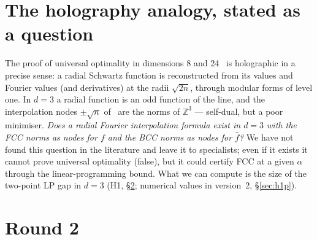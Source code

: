 \documentclass[11pt,a4paper]{article}
\begin{document}
\section{The holography analogy, stated as a question}
The proof of universal optimality in dimensions 8 and 24~\cite{CKMRV22} is holographic in a precise sense: a radial Schwartz function
is reconstructed from its values and Fourier values (and derivatives) at the radii $\sqrt{2n}$, through modular forms of level
one. In $d=3$ a radial function is an odd function of the line, and the interpolation nodes $\pm\sqrt n$ of~\cite{RV19} are the
norms of $\mathbb Z^3$ --- self-dual, but a poor minimiser. \emph{Does a radial Fourier interpolation formula exist in $d=3$ with the
FCC norms as nodes for $f$ and the BCC norms as nodes for $\hat f$?} We have not found this question in the literature and leave it
to specialists; even if it exists it cannot prove universal optimality (false), but it could certify FCC at a given $\alpha$ through
the linear-programming bound. What we can compute is the size of the two-point LP gap in $d=3$ (H1, \S\ref{sec:round2}; numerical values in version~2, \S\ref{sec:h1p}).

\section{Round 2}\label{sec:round2}

\end{document}
